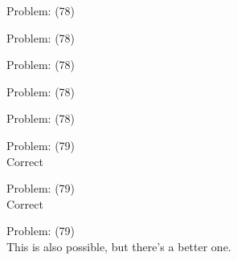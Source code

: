 \documentclass[11pt]{article}
\begin{document}
\begin{minipage}[t]{0.5\textwidth}
  {\centering
  
  Problem: (78)\\
  
  }
\end{minipage}
\begin{minipage}[t]{0.5\textwidth}
  {\centering
  
  Problem: (78)\\
  
  }
\end{minipage}
\begin{minipage}[t]{0.5\textwidth}
  {\centering
  
  Problem: (78)\\
  
  }
\end{minipage}
\begin{minipage}[t]{0.5\textwidth}
  {\centering
  
  Problem: (78)\\
  
  }
\end{minipage}
\begin{minipage}[t]{0.5\textwidth}
  {\centering
  
  Problem: (78)\\
  
  }
\end{minipage}
\begin{minipage}[t]{0.5\textwidth}
  {\centering
  
  Problem: (79)\\
  Correct\\
  }
\end{minipage}
\begin{minipage}[t]{0.5\textwidth}
  {\centering
  
  Problem: (79)\\
  Correct\\
  }
\end{minipage}
\begin{minipage}[t]{0.5\textwidth}
  {\centering
  
  Problem: (79)\\
  This is also possible, but there's a better one.\\
  }
\end{minipage}
\end{document}
